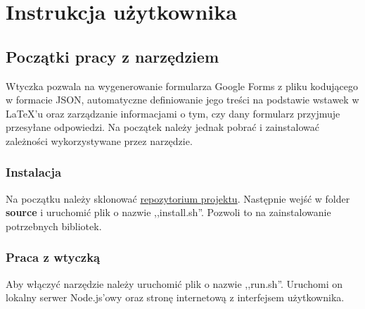 
\chapter{Instrukcja użytkownika}
\section{Początki pracy  z narzędziem}
Wtyczka pozwala na wygenerowanie formularza Google Forms z pliku kodującego w formacie JSON, automatyczne definiowanie jego treści na podstawie wstawek w \LaTeX{}'u oraz zarządzanie informacjami o tym, czy dany formularz przyjmuje przesyłane odpowiedzi. Na początek należy jednak pobrać i zainstalować zależności wykorzystywane przez narzędzie.
\subsection{Instalacja}
Na początku należy sklonować \href{https://github.com/agnpawicka/pracaInzynierska/}{repozytorium projektu}.
\ind Następnie wejść w folder \textbf{source} i uruchomić plik o nazwie ,,install.sh''. Pozwoli to na zainstalowanie potrzebnych bibliotek.
\subsection{Praca z wtyczką}
Aby włączyć narzędzie należy uruchomić plik o nazwie ,,run.sh''. Uruchomi on lokalny serwer Node.js'owy oraz stronę internetową z interfejsem użytkownika.
